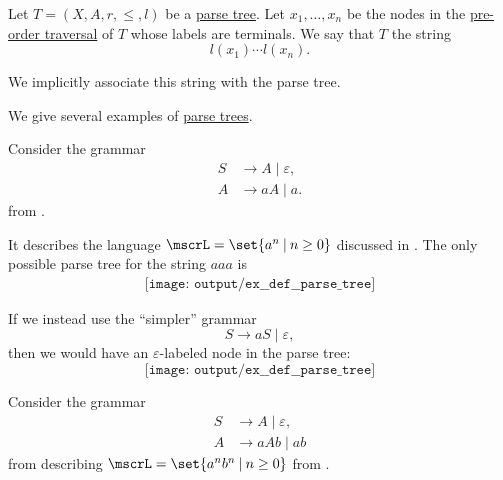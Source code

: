 \begin{definition}\label{def:parse_tree_string}
  Let \( T = (X, A, r, \leq, l) \) be a \hyperref[def:parse_tree]{parse tree}. Let \( x_1, \ldots, x_n \) be the nodes in the \hyperref[def:traversal_ordering]{pre-order traversal} of \( T \) whose labels are terminals. We say that \( T \)  the string
  \begin{equation*}
    l(x_1) \cdots l(x_n).
  \end{equation*}

  We implicitly associate this string with the parse tree.
\end{definition}

\begin{example}\label{ex:def:parse_tree}
  We give several examples of \hyperref[def:parse_tree]{parse trees}.

  \begin{thmenum}
     Consider the grammar
    \begin{equation*}
      \begin{aligned}
        S &\to A \mid \varepsilon, \\
        A &\to aA \mid a.
      \end{aligned}
    \end{equation*}
    from .

    It describes the language \( \mscrL = \set{ a^n \given n \geq 0 } \) discussed in . The only possible parse tree for the string \( aaa \) is
    \begin{equation*}\label{eq:ex:def:parse_tree/an}
      \begin{aligned}
        \texttt{[image: output/ex\_\_def\_\_parse\_tree]}
      \end{aligned}
    \end{equation*}

    If we instead use the \enquote{simpler} grammar
    \begin{equation*}
      S \to aS \mid \varepsilon,
    \end{equation*}
    then we would have an \( \varepsilon \)-labeled node in the parse tree:
    \begin{equation*}
      \texttt{[image: output/ex\_\_def\_\_parse\_tree]}
    \end{equation*}

     Consider the grammar
    \begin{equation*}
      \begin{aligned}
        S &\to A \mid \varepsilon, \\
        A &\to aAb \mid ab
      \end{aligned}
    \end{equation*}
    from  describing \( \mscrL = \set{ a^n b^n \given n \geq 0 } \) from .


\end{thmenum}
\end{example}

